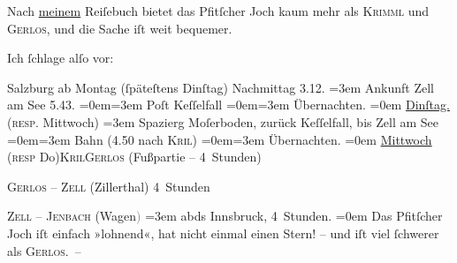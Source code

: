 \pstart
           Nach \uline{meinem} Reiſebuch bietet das Pfitſcher Joch kaum mehr als \textsc{Krimml} und \textsc{Gerlos}, und die Sache iſt weit bequemer.\pend
           
\pstart
           Ich ſchlage alſo vor:\pend
           
\pstart
           Salzburg ab Montag (ſpäteſtens
                  Dinſtag) Nachmittag 3.12.\pend
           \leftskip=3em{}
\pstart
           \noindent{}{\pb}Ankunft Zell am See{ }5.43.\pend
           \leftskip=0em{}\leftskip=3em{}
\pstart
           Poſt Keſſelfall\pend
           \leftskip=0em{}\leftskip=3em{}
\pstart
           Übernachten.\pend
           \leftskip=0em{}
\pstart
           \uline{Dinſtag.} (\textsc{resp}. Mittwoch)\pend
           \leftskip=3em{}
\pstart
           \noindent{}Spazierg Moſerboden, zurück Keſſelfall, bis Zell am See\pend
           \leftskip=0em{}\leftskip=3em{}
\pstart
           Bahn (4.50 nach \textsc{Kri{\geminationm}l})\pend
           \leftskip=0em{}\leftskip=3em{}
\pstart
           Übernachten.\pend
           \leftskip=0em{}
\pstart
           \uline{Mittwoch}{ }\introOben{}(\textsc{resp}{ }Do{\geminationn})\introOben{}{ }\textsc{Kri{\geminationm}l}\textsc{Gerlos} (Fußpartie – 4 Stunden)\pend
           
\pstart
           \textsc{Gerlos} – \textsc{Zell} (Zillerthal) 4 Stunden\pend
           
\pstart
           \textsc{Zell – Jenbach} (Wagen\textcolor{gray}{)}\pend
           \leftskip=3em{}
\pstart
           \noindent{}abds{ }Innsbruck, 4 Stunden.\pend
           \leftskip=0em{}
\pstart
           {\pb}Das Pfitſcher
                  Joch iſt einfach »lohnend«, hat nicht einmal einen Stern! – und iſt
               viel ſchwerer als \textsc{Gerlos}. –\pend
           
